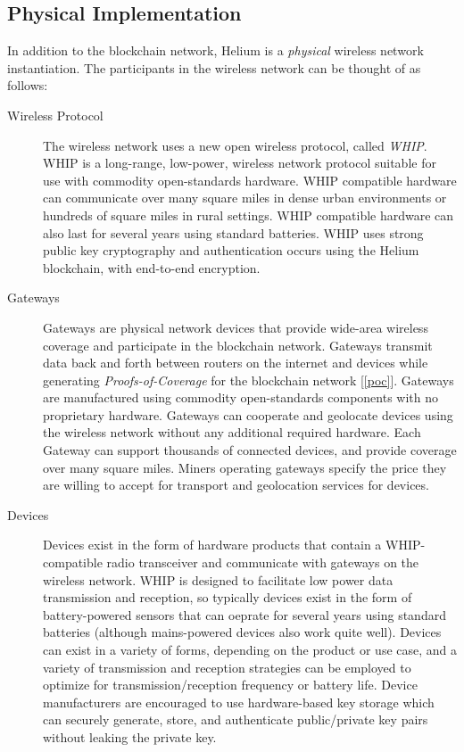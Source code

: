 \documentclass[UTF8, 10pt, nonatbib, nocopyrightspace, reprint]{sigplanconf}
\newcommand{\secref}[1]{[\autoref{#1}]}
\begin{document}
\subsection{Physical Implementation}

In addition to the blockchain network, Helium is a \emph{physical} wireless network instantiation. The participants in the wireless network can be thought of as follows:

\begin{description}
    \item [Wireless Protocol] The wireless network uses a new open wireless protocol, called \emph{WHIP}. WHIP is a long-range, low-power, wireless network protocol suitable for use with commodity open-standards hardware. WHIP compatible hardware can communicate over many square miles in dense urban environments or hundreds of square miles in rural settings. WHIP compatible hardware can also last for several years using standard batteries. WHIP uses strong public key cryptography and authentication occurs using the Helium blockchain, with end-to-end encryption.

    \item [Gateways] Gateways are physical network devices that provide wide-area wireless coverage and participate in the blockchain network. Gateways transmit data back and forth between routers on the internet and devices while generating \emph{Proofs-of-Coverage} for the blockchain network \secref{poc}. Gateways are manufactured using commodity open-standards components with no proprietary hardware. Gateways can cooperate and geolocate devices using the wireless network without any additional required hardware. Each Gateway can support thousands of connected devices, and provide coverage over many square miles. Miners operating gateways specify the price they are willing to accept for transport and geolocation services for devices.

    \item [Devices] Devices exist in the form of hardware products that contain a WHIP-compatible radio transceiver and communicate with gateways on the wireless network. WHIP is designed to facilitate low power data transmission and reception, so typically devices exist in the form of battery-powered sensors that can oeprate for several years using standard batteries (although mains-powered devices also work quite well). Devices can exist in a variety of forms, depending on the product or use case, and a variety of transmission and reception strategies can be employed to optimize for transmission/reception frequency or battery life. Device manufacturers are encouraged to use hardware-based key storage which can securely generate, store, and authenticate public/private key pairs without leaking the private key.
\end{description}
\end{document}
